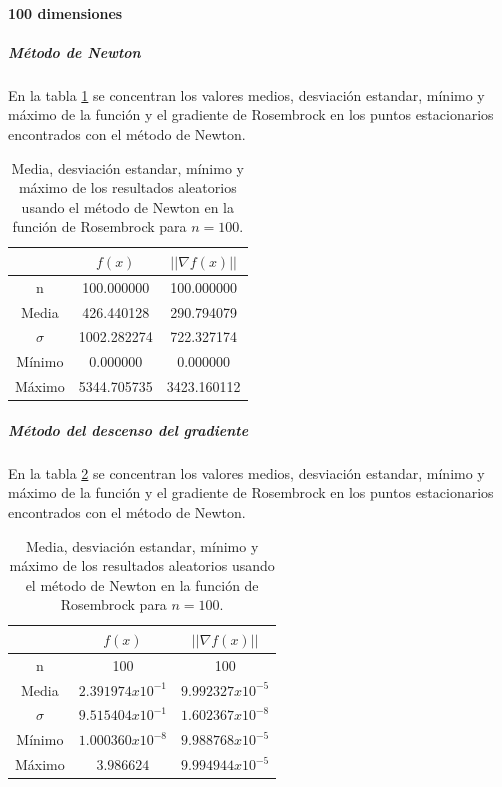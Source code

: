 \paragraph{100 dimensiones}

\subparagraph{Método de Newton}

En la tabla \ref{table:rosembrock_100_random_newton} se concentran los valores medios, desviación estandar, mínimo y máximo de la función y el gradiente de Rosembrock en los puntos estacionarios encontrados con el método de Newton.

\begin{table}[H]
    \centering
    \begin{tabular}{ccc} \hline
                 & $f(x)$      & $||\nabla f(x)||$ \\ \hline
        n        & 100.000000  & 100.000000        \\
        Media    & 426.440128  & 290.794079        \\
        $\sigma$ & 1002.282274 & 722.327174        \\
        Mínimo   & 0.000000    & 0.000000          \\
        Máximo   & 5344.705735 & 3423.160112       \\ \hline
    \end{tabular}
    \caption{Media, desviación estandar, mínimo y máximo de los resultados aleatorios usando el método de Newton en la función de Rosembrock para $n=100$.}
    \label{table:rosembrock_100_random_newton}
\end{table}

\subparagraph{Método del descenso del gradiente}

En la tabla \ref{table:rosembrock_100_random_gradient} se concentran los valores medios, desviación estandar, mínimo y máximo de la función y el gradiente de Rosembrock en los puntos estacionarios encontrados con el método de Newton.

\begin{table}[H]
    \centering
    \begin{tabular}{ccc} \hline
                 & $f(x)$             & $||\nabla f(x)||$  \\ \hline
        n        & 100                & 100                \\
        Media    & $2.391974x10^{-1}$ & $9.992327x10^{-5}$ \\
        $\sigma$ & $9.515404x10^{-1}$ & $1.602367x10^{-8}$ \\
        Mínimo   & $1.000360x10^{-8}$ & $9.988768x10^{-5}$ \\
        Máximo   & $3.986624$         & $9.994944x10^{-5}$ \\ \hline
    \end{tabular}
    \caption{Media, desviación estandar, mínimo y máximo de los resultados aleatorios usando el método de Newton en la función de Rosembrock para $n=100$.}
    \label{table:rosembrock_100_random_gradient}
\end{table}
